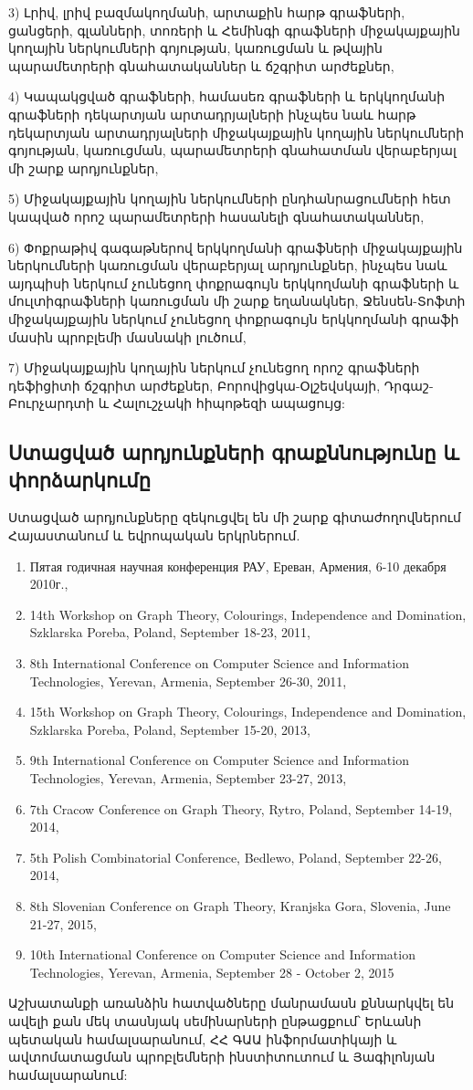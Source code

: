 3) Լրիվ, լրիվ բազմակողմանի, արտաքին հարթ գրաֆների, ցանցերի, գլանների, տոռերի և Հեմինգի գրաֆների միջակայքային կողային ներկումների գոյության, կառուցման և թվային պարամետրերի գնահատականներ և ճշգրիտ արժեքներ,

4) Կապակցված գրաֆների, համասեռ գրաֆների և երկկողմանի գրաֆների դեկարտյան արտադրյալների ինչպես նաև հարթ դեկարտյան արտադրյալների միջակայքային կողային ներկումների գոյության, կառուցման, պարամետրերի գնահատման վերաբերյալ մի շարք արդյունքներ,

5) Միջակայքային կողային ներկումների ընդհանրացումների հետ կապված որոշ պարամետրերի հասանելի գնահատականներ,

6) Փոքրաթիվ գագաթներով երկկողմանի գրաֆների միջակայքային ներկումների կառուցման վերաբերյալ արդյունքներ, ինչպես նաև այդպիսի ներկում չունեցող փոքրագույն երկկողմանի գրաֆների և մուլտիգրաֆների կառուցման մի շարք եղանակներ, Ջենսեն-Տոֆտի միջակայքային ներկում չունեցող փոքրագույն երկկողմանի գրաֆի մասին պրոբլեմի մասնակի լուծում,

7) Միջակայքային կողային ներկում չունեցող որոշ գրաֆների դեֆիցիտի ճշգրիտ արժեքներ, Բորովիցկա-Օլշեվսկայի, Դրգաշ-Բուրչարդտի և Հալուշչակի հիպոթեզի ապացույց:


\subsection*{Ստացված արդյունքների գրաքննությունը և փորձարկումը}

Ստացված արդյունքները զեկուցվել են մի շարք գիտաժողովներում Հայաստանում և եվրոպական երկրներում.
\begin{enumerate}
\item Пятая годичная научная конференция РАУ, Ереван, Армения, 6-10 декабря 2010г.,
\item 14th Workshop on Graph Theory, Colourings, Independence and Domination, Szklarska Poreba, Poland, September 18-23, 2011,
\item 8th International Conference on Computer Science and Information Technologies, Yerevan, Armenia, September 26-30, 2011,
\item 15th Workshop on Graph Theory, Colourings, Independence and Domination, Szklarska Poreba, Poland, September 15-20, 2013,
\item 9th International Conference on Computer Science and Information Technologies, Yerevan, Armenia, September 23-27, 2013,
\item 7th Cracow Conference on Graph Theory, Rytro, Poland, September 14-19, 2014,
\item 5th Polish Combinatorial Conference, Bedlewo, Poland, September 22-26, 2014,
\item 8th Slovenian Conference on Graph Theory, Kranjska Gora, Slovenia, June 21-27, 2015,
\item 10th International Conference on Computer Science and Information Technologies, Yerevan, Armenia, September 28 - October 2, 2015
\end{enumerate}
Աշխատանքի առանձին հատվածները մանրամասն քննարկվել են ավելի քան մեկ տասնյակ սեմինարների ընթացքում՝ Երևանի պետական համալսարանում, ՀՀ ԳԱԱ ինֆորմատիկայի և ավտոմատացման պրոբլեմների ինստիտուտում և Յագիլոնյան համալսարանում:


